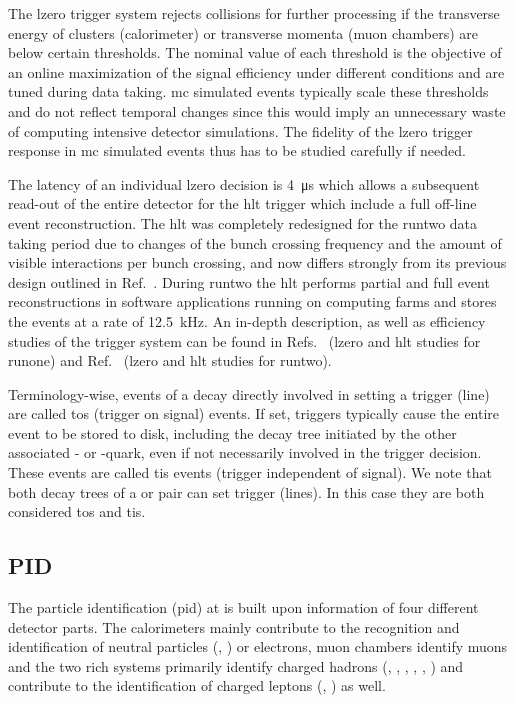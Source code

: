 The \gls{lzero} trigger system rejects collisions for further processing if the transverse energy of clusters (calorimeter) or transverse momenta (muon chambers) are below certain thresholds.
The nominal value of each threshold is the objective of an online maximization of the signal efficiency under different \lhc conditions and are tuned during data taking.
\gls{mc} simulated events typically scale these thresholds and do not reflect temporal changes since this would imply an unnecessary waste of computing intensive detector simulations.
The fidelity of the \gls{lzero} trigger response in \gls{mc} simulated events thus has to be studied carefully if needed.

The latency of an individual \gls{lzero} decision is \SI{4}{\micro\second} which allows a subsequent read-out of the entire detector for the \gls{hlt} trigger which include a full off-line event reconstruction.
The \gls{hlt} was completely redesigned for the \gls{runtwo} data taking period due to changes of the bunch crossing frequency and the amount of visible interactions per bunch crossing, and now differs strongly from its previous design outlined in Ref.~\cite{lhcbDetector}.
During \gls{runtwo} the \gls{hlt} performs partial and full event reconstructions in software applications running on computing farms and stores the events at a rate of \SI{12.5}{\kilo\hertz}.
An in-depth description, as well as efficiency studies of the \lhcb trigger system can be found in Refs.~\cite{trigger11,trigger12} (\gls{lzero} and \gls{hlt} studies for \gls{runone}) and Ref.~\cite{triggerRun2} (\gls{lzero} and \gls{hlt} studies for \gls{runtwo}).

Terminology-wise, events of a decay directly involved in setting a trigger (line) are called \gls{tos} (trigger on signal) events.
If set, triggers typically cause the entire event to be stored to disk, including the decay tree initiated by the other associated \bquark- or \cquark-quark, even if not necessarily involved in the trigger decision.
These events are called \gls{tis} events (trigger independent of signal).
We note that both decay trees of a \bbbar or \ccbar pair can set trigger (lines).
In this case they are both considered \gls{tos} and \gls{tis}.

\subsection{PID}
\label{sec:detector_pid}
The particle identification (\gls{pid}) at \lhcb is built upon information of four different detector parts.
The calorimeters mainly contribute to the recognition and identification of neutral particles (\Pgamma, \piz) or electrons, muon chambers identify muons and the two \gls{rich} systems primarily identify charged hadrons (\pip, \pim, \Kp, \Km, \proton, \antiproton) and contribute to the identification of charged leptons (\electron, \muon) as well.

